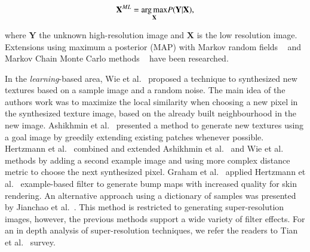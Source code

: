 \begin{equation}
\mathbf{X}^{ML} = \underset{\mathbf{X}}{\operatorname*{arg\,max}} P(\mathbf{Y} | \mathbf{X}),
\end{equation} 

where $\mathbf{Y}$ the unknown high-resolution image and $\mathbf{X}$ is the low resolution image.
Extensions using maximum a posterior (MAP) with Markov random fields ~\cite{Humblot:2006} and Markov Chain Monte Carlo methods ~\cite{Tian:2010} have been researched.

In the \textit{learning}-based area, Wie et al.~\cite{Wei:2000} proposed a technique to synthesized new textures based on a sample image and a random noise.
The main idea of the authors work was to maximize the local similarity when choosing a new pixel in the synthesized texture image, based on the already built neighbourhood in the new image.
Ashikhmin et al.~\cite{Ashikhmin2001} presented a method to generate new textures using a goal image by greedily extending existing patches whenever possible.
Hertzmann et al.~\cite{Hertzmann2001} combined and extended Ashikhmin et al.~\cite{Ashikhmin2001} and Wie et al.~\cite{Wei:2000} methods by adding a second example image and using more complex distance metric to choose the next synthesized pixel.
Graham et al.~\cite{Graham2013} applied Hertzmann et al.~\cite{Hertzmann2001} example-based filter to generate bump maps with increased quality for skin rendering.
An alternative approach using a dictionary of samples was presented by Jianchao et al.~\cite{Jianchao2010}.
This method is restricted to generating super-resolution images, however, the previous methods support a wide variety of filter effects.
For an in depth analysis of super-resolution techniques, we refer the readers to Tian et al.~\cite{Tian2011} survey.

